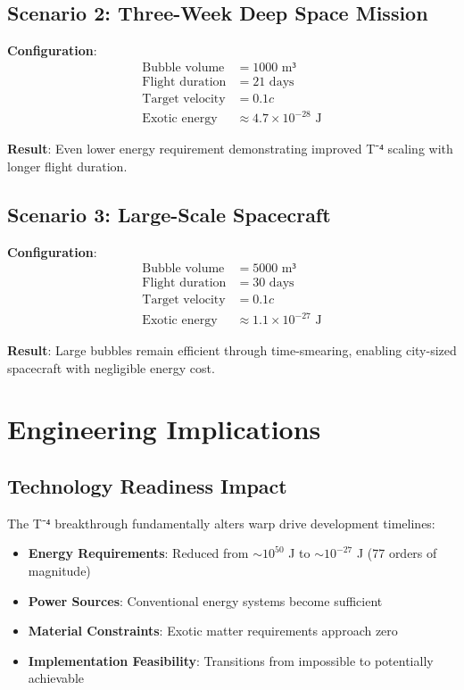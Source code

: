 \documentclass[12pt,a4paper]{article}
\begin{document}
\subsection{Scenario 2: Three-Week Deep Space Mission}

\textbf{Configuration}:
\begin{align}
\text{Bubble volume} &= 1000 \text{ m³} \\
\text{Flight duration} &= 21 \text{ days} \\
\text{Target velocity} &= 0.1c \\
\text{Exotic energy} &\approx 4.7 \times 10^{-28} \text{ J}
\end{align}

\textbf{Result}: Even lower energy requirement demonstrating improved T⁻⁴ scaling with longer flight duration.

\subsection{Scenario 3: Large-Scale Spacecraft}

\textbf{Configuration}:
\begin{align}
\text{Bubble volume} &= 5000 \text{ m³} \\
\text{Flight duration} &= 30 \text{ days} \\
\text{Target velocity} &= 0.1c \\
\text{Exotic energy} &\approx 1.1 \times 10^{-27} \text{ J}
\end{align}

\textbf{Result}: Large bubbles remain efficient through time-smearing, enabling city-sized spacecraft with negligible energy cost.

\section{Engineering Implications}

\subsection{Technology Readiness Impact}

The T⁻⁴ breakthrough fundamentally alters warp drive development timelines:

\begin{itemize}
\item \textbf{Energy Requirements}: Reduced from $\sim 10^{50}$ J to $\sim 10^{-27}$ J (77 orders of magnitude)
\item \textbf{Power Sources}: Conventional energy systems become sufficient
\item \textbf{Material Constraints}: Exotic matter requirements approach zero
\item \textbf{Implementation Feasibility}: Transitions from impossible to potentially achievable
\end{itemize}
\end{document}
